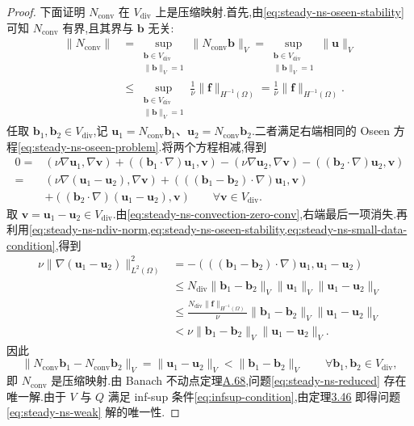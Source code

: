 \begin{proof}
下面证明 $N_{\mathrm{conv}}$ 在 $V_{\mathrm{div}}$ 上是压缩映射.首先,由\cref{eq:steady-ns-oseen-stability} 可知 $N_{\mathrm{conv}}$ 有界,且其界与 $\bm{b}$ 无关:
\[
\begin{aligned}
  \|N_{\mathrm{conv}}\|
   &=\sup_{\substack{\bm{b}\in V_{\mathrm{div}}\\
                      \|\bm{b}\|_V=1}}
      \|N_{\mathrm{conv}}\bm{b}\|_V
     =\sup_{\substack{\bm{b}\in V_{\mathrm{div}}\\
                      \|\bm{b}\|_V=1}}\|\bm{u}\|_V\\
   &\le\sup_{\substack{\bm{b}\in V_{\mathrm{div}}\\
                      \|\bm{b}\|_V=1}}
        \frac1\nu\|\bm{f}\|_{H^{-1}(\Omega)}
     =\frac1\nu\|\bm{f}\|_{H^{-1}(\Omega)}.
\end{aligned}
\]
任取 $\bm{b}_1,\bm{b}_2\in V_{\mathrm{div}}$,记 $\bm{u}_1=N_{\mathrm{conv}}\bm{b}_1$、$\bm{u}_2=N_{\mathrm{conv}}\bm{b}_2$.二者满足右端相同的 Oseen 方程\cref{eq:steady-ns-oseen-problem}.将两个方程相减,得到
\[
\begin{aligned}
  0={}&(\nu\nabla\bm{u}_1,\nabla\bm{v})
       +((\bm{b}_1\cdot\nabla)\bm{u}_1,\bm{v})
       -(\nu\nabla\bm{u}_2,\nabla\bm{v})
       -((\bm{b}_2\cdot\nabla)\bm{u}_2,\bm{v})\\
   ={}&(\nu\nabla(\bm{u}_1-\bm{u}_2),\nabla\bm{v})
       +(((\bm{b}_1-\bm{b}_2)\cdot\nabla)\bm{u}_1,\bm{v})\\
     &+((\bm{b}_2\cdot\nabla)(\bm{u}_1-\bm{u}_2),\bm{v})
       \qquad\forall\bm{v}\in V_{\mathrm{div}}.
\end{aligned}
\]
取 $\bm{v}=\bm{u}_1-\bm{u}_2\in V_{\mathrm{div}}$.由\cref{eq:steady-ns-convection-zero-conv},右端最后一项消失.再利用\cref{eq:steady-ns-ndiv-norm,eq:steady-ns-oseen-stability,eq:steady-ns-small-data-condition},得到
\[
\begin{aligned}
  \nu\|\nabla(\bm{u}_1-\bm{u}_2)\|_{L^2(\Omega)}^2
   &=-(((\bm{b}_1-\bm{b}_2)\cdot\nabla)\bm{u}_1,
             \bm{u}_1-\bm{u}_2)\\
   &\le N_{\mathrm{div}}\|\bm{b}_1-\bm{b}_2\|_V
       \|\bm{u}_1\|_V\|\bm{u}_1-\bm{u}_2\|_V\\
   &\le\frac{N_{\mathrm{div}}\|\bm{f}\|_{H^{-1}(\Omega)}}{\nu}
        \|\bm{b}_1-\bm{b}_2\|_V
        \|\bm{u}_1-\bm{u}_2\|_V\\
   &<\nu\|\bm{b}_1-\bm{b}_2\|_V
        \|\bm{u}_1-\bm{u}_2\|_V.
\end{aligned}
\]
因此
\[
  \|N_{\mathrm{conv}}\bm{b}_1-N_{\mathrm{conv}}\bm{b}_2\|_V
    =\|\bm{u}_1-\bm{u}_2\|_V
     <\|\bm{b}_1-\bm{b}_2\|_V
       \qquad\forall\bm{b}_1,\bm{b}_2\in V_{\mathrm{div}},
\]
即 $N_{\mathrm{conv}}$ 是压缩映射.由 Banach 不动点定理\hyperref[thm:appendix-a-68]{A.68},问题\cref{eq:steady-ns-reduced} 存在唯一解.由于 $V$ 与 $Q$ 满足 inf-sup 条件\cref{eq:infsup-condition},由定理\hyperref[thm:infsup-v-q]{3.46} 即得问题\cref{eq:steady-ns-weak} 解的唯一性.
\end{proof}

